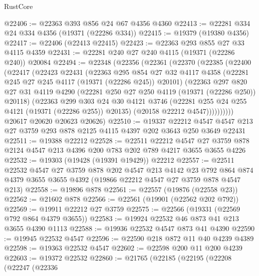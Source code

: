 \begin{lexlean}{RustCore}
\begin{coremodule}
@22406 := @22363 @393 @856 @24 @67 @4356 @4360
@22413 := @22281 @334 @24 @334 @4356 (@19371 (@22286 @334))
@22415 := @19379 (@19380 @4356)
@22417 := @22406 (@22413 @22415)
@22423 := @22363 @293 @855 @27 @33 @4115 @4359
@22431 := @22281 @240 @27 @240 @4115 (@19371 (@22286 @240)) @20084
@22494 := @22348
    (@22356
      (@22361
        (@22370
          (@22385
            (@22400
              (@22417
                (@22423
                  @22431
                  (@22363
                    @295
                    @854
                    @27
                    @32
                    @4117
                    @4358
                    (@22281 @245 @27 @245 @4117 (@19371 (@22286 @245)) @20101)
                    (@22363
                      @297
                      @820
                      @27
                      @31
                      @4119
                      @4290
                      (@22281 @250 @27 @250 @4119 (@19371 (@22286 @250)) @20118)
                      (@22363
                        @299
                        @303
                        @24
                        @30
                        @4121
                        @3746
                        (@22281 @255 @24 @255 @4121 (@19371 (@22286 @255)) @20135)
                        (@20158 @22212 @4547))))))))))
      @20617
      @20620
      @20623
      @20626)
@22510 := @19337
    @22212
    @4547
    @4547
    @213
    @27
    @3759
    @293
    @878
    @2125
    @4115
    @4397
    @202
    @3643
    @250
    @3649
    @22431
@22511 := @19388 @22212
@22528 := @22511
    @22212
    @4547
    @27
    @3759
    @878
    @2124
    @4547
    @213
    @4396
    @200
    @783
    @202
    @789
    @4217
    @3655
    @3655
    @4226
@22532 := @19303 (@19428 (@19391 @19429)) @22212
@22557 := @22511
    @22532
    @4547
    @27
    @3759
    @878
    @202
    @4547
    @213
    @4142
    @23
    @792
    @864
    @874
    @4379
    @3655
    @3655
    @4392
    (@19866 @22212 @4547 @27 @3759 @878 @4547 @213)
@22558 := @19896 @878
@22561 := @22557 (@19876 (@22558 @23))
@22562 := @21602 @878
@22566 := @22561 (@19901 (@22562 @202 @792))
@22569 := @19911 @22212 @27 @3759
@22575 := @22566 (@19331 (@22569 @792 @864 @4379 @3655))
@22583 := @19924 @22532 @46 @873 @41 @213 @3655 @4390 @1113
@22588 := @19936 @22532 @4547 @873 @41 @4390
@22590 := @19945 @22532 @4547
@22596 := @22590 @218 @872 @11 @40 @4239 @4389
@22598 := @19363 @22532 @4547
@22602 := @22598 @200 @11 @200 @4239
@22603 := @19372 @22532
@22860 := @21765
    (@22185
      (@22195
        (@22208
          (@22247
            (@22336

\end{coremodule}
\end{lexlean}
